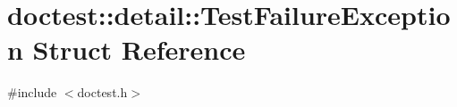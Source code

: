 \hypertarget{structdoctest_1_1detail_1_1_test_failure_exception}{}\section{doctest\+:\+:detail\+:\+:Test\+Failure\+Exception Struct Reference}
\label{structdoctest_1_1detail_1_1_test_failure_exception}


{\ttfamily \#include $<$doctest.\+h$>$}

